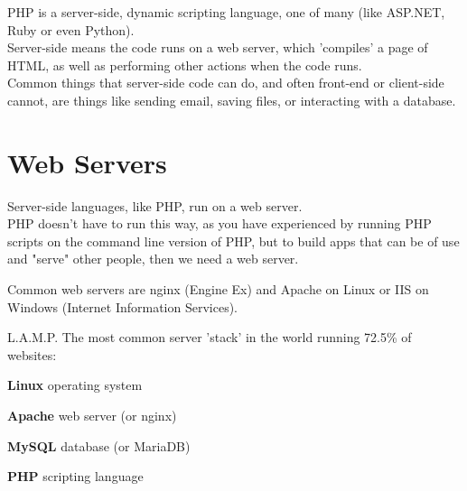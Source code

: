 PHP is a server-side, dynamic scripting language, one of many (like ASP.NET, Ruby or even Python).
\\

Server-side means the code runs on a web server, which 'compiles' a page of HTML, as well as performing other actions when the code runs.
\\

Common things that server-side code can do, and often front-end or client-side cannot, are things like sending email, saving files, or interacting with a database.

\section{Web Servers}

Server-side languages, like PHP, run on a web server.
\\

PHP doesn't have to run this way, as you have experienced by running PHP scripts on the command line version of PHP, but to build apps that can be of use and "serve" other people, then we need a web server.
\\


Common web servers are nginx (Engine Ex) and Apache on Linux or IIS on Windows (Internet Information Services).

\begin{infobox}{L.A.M.P.}
    The most common server 'stack' in the world running 72.5\% of websites:
    
    \item \textbf{Linux} operating system 
    \item \textbf{Apache} web server (or nginx)
    \item \textbf{MySQL} database (or MariaDB)
    \item \textbf{PHP} scripting language
\end{infobox}
